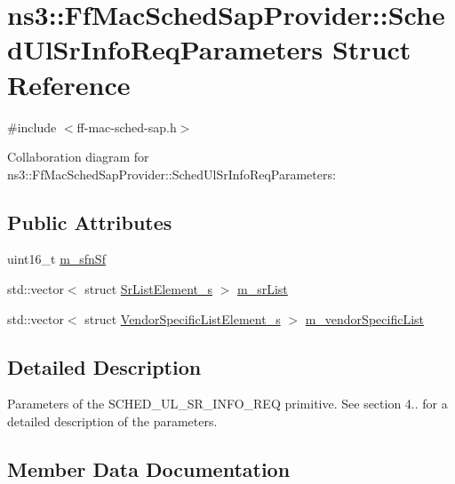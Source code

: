 \hypertarget{structns3_1_1FfMacSchedSapProvider_1_1SchedUlSrInfoReqParameters}{}\section{ns3\+:\+:Ff\+Mac\+Sched\+Sap\+Provider\+:\+:Sched\+Ul\+Sr\+Info\+Req\+Parameters Struct Reference}
\label{structns3_1_1FfMacSchedSapProvider_1_1SchedUlSrInfoReqParameters}


{\ttfamily \#include $<$ff-\/mac-\/sched-\/sap.\+h$>$}



Collaboration diagram for ns3\+:\+:Ff\+Mac\+Sched\+Sap\+Provider\+:\+:Sched\+Ul\+Sr\+Info\+Req\+Parameters\+:
\subsection*{Public Attributes}
\begin{DoxyCompactItemize}
\item 
uint16\+\_\+t \hyperlink{structns3_1_1FfMacSchedSapProvider_1_1SchedUlSrInfoReqParameters_ac6b78c1671c1b3e3708331a94192ddba}{m\+\_\+sfn\+Sf}
\item 
std\+::vector$<$ struct \hyperlink{structns3_1_1SrListElement__s}{Sr\+List\+Element\+\_\+s} $>$ \hyperlink{structns3_1_1FfMacSchedSapProvider_1_1SchedUlSrInfoReqParameters_aa85674561b14624ac5f170dd91b5dbd0}{m\+\_\+sr\+List}
\item 
std\+::vector$<$ struct \hyperlink{structns3_1_1VendorSpecificListElement__s}{Vendor\+Specific\+List\+Element\+\_\+s} $>$ \hyperlink{structns3_1_1FfMacSchedSapProvider_1_1SchedUlSrInfoReqParameters_a17b9fd9414c6f5e0318cf5743cfcb9f4}{m\+\_\+vendor\+Specific\+List}
\end{DoxyCompactItemize}


\subsection{Detailed Description}
Parameters of the S\+C\+H\+E\+D\+\_\+\+U\+L\+\_\+\+S\+R\+\_\+\+I\+N\+F\+O\+\_\+\+R\+EQ primitive. See section 4.. for a detailed description of the parameters. 

\subsection{Member Data Documentation}
